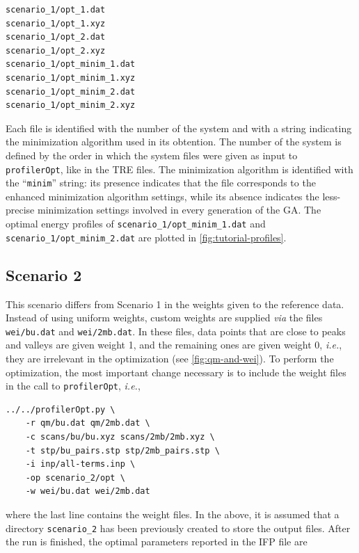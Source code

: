 \documentclass[10pt,a4paper,openany]{memoir}
\numberwithin{equation}{section}
\newcommand{\under}{\_}
\newcommand{\profileropt}[0]{\texttt{profilerOpt}}
\begin{document}
\begin{lstlisting}
scenario_1/opt_1.dat
scenario_1/opt_1.xyz
scenario_1/opt_2.dat
scenario_1/opt_2.xyz
scenario_1/opt_minim_1.dat
scenario_1/opt_minim_1.xyz
scenario_1/opt_minim_2.dat
scenario_1/opt_minim_2.xyz
\end{lstlisting}\vspace{1ex}\par
\noindent Each file is identified with the number of the system and
with a string indicating the minimization algorithm used in its
obtention.
%
The number of the system is defined by the order in which the system
files were given as input to \profileropt{}, like in the TRE files.
%
The minimization algorithm is identified with the ``\texttt{minim}''
string:
%
its presence indicates that the file corresponds to the enhanced
minimization algorithm settings, while
%
its absence indicates the less-precise minimization settings involved
in every generation of the GA.
%
The optimal energy profiles of
\texttt{scenario\under{}1/opt\under{}minim\under{}1.dat} and
\texttt{scenario\under{}1/opt\under{}minim\under{}2.dat} are plotted
in \autoref{fig:tutorial-profiles}.

\subsection{Scenario 2}
\label{sec:tutorial-scenario-2}

This scenario differs from Scenario 1 in the weights given to the
reference data.
%
Instead of using uniform weights, custom weights are supplied
\textit{via} the files \texttt{wei/bu.dat} and \texttt{wei/2mb.dat}.
%
In these files, data points that are close to peaks and valleys are
given weight 1, and the remaining ones are given weight 0,
\textit{i.e.}, they are irrelevant in the optimization (see
\autoref{fig:qm-and-wei}).
%
To perform the optimization, the most important change necessary is to
include the weight files in the call to \profileropt, \textit{i.e.},

\begin{lstlisting}
../../profilerOpt.py \
    -r qm/bu.dat qm/2mb.dat \
    -c scans/bu/bu.xyz scans/2mb/2mb.xyz \
    -t stp/bu_pairs.stp stp/2mb_pairs.stp \
    -i inp/all-terms.inp \
    -op scenario_2/opt \
    -w wei/bu.dat wei/2mb.dat
\end{lstlisting}\vspace{1ex}\par

\noindent where the last line contains the weight files.
%
In the above, it is assumed that a directory
\texttt{scenario\under{}2} has been previously created to store the
output files.
%
After the run is finished, the optimal parameters reported in the IFP
file are
\end{document}
